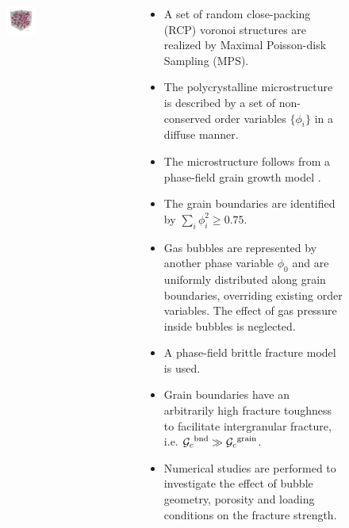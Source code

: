 \begin{frame}{}
\begin{columns}
\begin{column}{0.3\textwidth}
\begin{figure}[htb!]
            \begin{subfigure}{\textwidth}
                \centering
                \includegraphics[width=0.5\textwidth]{past/figures/b150_ini_new.png}
            \end{subfigure}
        \end{figure}
    \end{column}
    \begin{column}{0.7\textwidth}
        \begin{itemize}
            \item A set of random close-packing (RCP) voronoi structures are realized by Maximal Poisson-disk Sampling (MPS).
            \item The polycrystalline microstructure is described by a set of non-conserved order variables $\{\phi_i\}$ in a diffuse manner.
            \item The microstructure follows from a phase-field grain growth model \cite{Moelans2008}.
            \item The grain boundaries are identified by $\sum_i \phi_i^2 \geqslant 0.75$.
            \item Gas bubbles are represented by another phase variable $\phi_0$ and are uniformly distributed along grain boundaries, overriding existing order variables. The effect of gas pressure inside bubbles is neglected.
            \pause
            \item A phase-field brittle fracture model is used.
            \item Grain boundaries have an arbitrarily high fracture toughness to facilitate intergranular fracture, i.e. ${\mathcal{G}_c}^\text{bnd} \gg {\mathcal{G}_c}^\text{grain}$.
            \pause
            \item \textcolor<4>{dukeroyal}{Numerical studies are performed to investigate the effect of bubble geometry, porosity and loading conditions on the fracture strength.}
        \end{itemize}
    \end{column}
\end{columns}
\end{frame}

